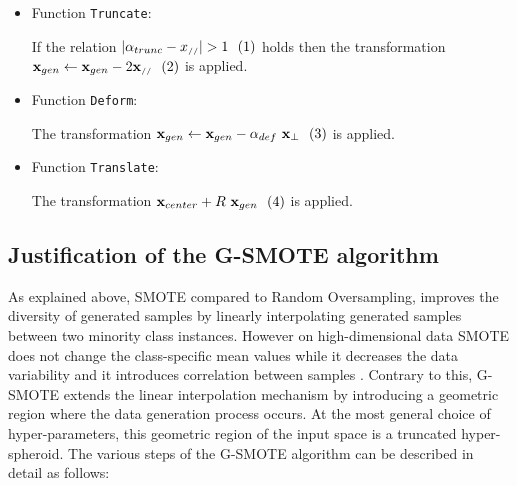 \documentclass[parskip=full]{scrartcl}
\newcommand{\inlineeqnum}{\refstepcounter{equation}~~\mbox{(\theequation)}}
\begin{document}
\begin{itemize}
	 \item Function \texttt{Truncate}:
	 
	 	If the relation \( |\alpha_{trunc} - x_{\scriptscriptstyle//}| > 1
	 	\inlineeqnum\label{eqn:condition} \) holds then the transformation \(
	 	\textbf{x}_{gen} \leftarrow \textbf{x}_{gen} - 2
	 	\textbf{x}_{\scriptscriptstyle//} \inlineeqnum\label{eqn:truncate} \) is
	 	applied.
	
	\item Function \texttt{Deform}: 
			
		The transformation \( \textbf{x}_{gen} \leftarrow \textbf{x}_{gen} -
		\alpha_{def} \  \textbf{x}_{\bot} \inlineeqnum\label{eqn:deform} \) is
		applied.
			
	\item Function \texttt{Translate}:
	
		The transformation \( \textbf{x}_{center} +  R \ \textbf{x}_{gen}
		\inlineeqnum\label{eqn:translate} \) is applied.
	
\end{itemize}

\subsection{Justification of the G-SMOTE algorithm}

As explained above, SMOTE compared to Random Oversampling, improves the
diversity of generated samples by linearly interpolating generated samples
between two minority class instances. However on high-dimensional data SMOTE
does not change the class-specific mean values while it decreases the data
variability and it introduces correlation between samples \cite{Blagus2013}.
Contrary to this, G-SMOTE extends the linear interpolation mechanism by
introducing a geometric region where the data generation process occurs. At the
most general choice of hyper-parameters, this geometric region of the input
space is a truncated hyper-spheroid. The various steps of the G-SMOTE algorithm
can be described in detail as follows:
\end{document}
